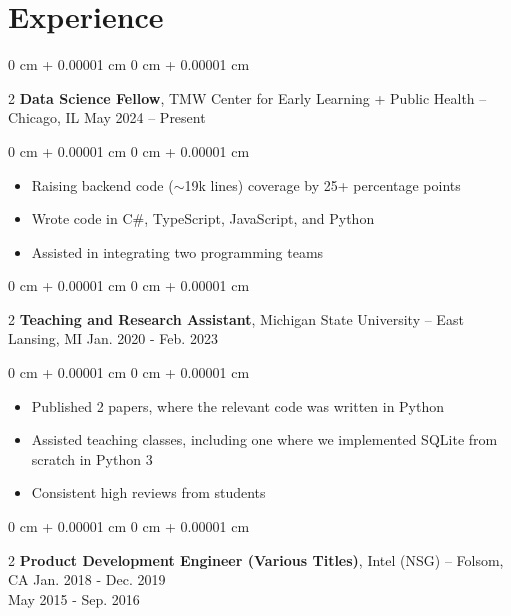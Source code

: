 \documentclass[10pt, letterpaper]{article}
\newenvironment{highlights}{ \begin{itemize}[ topsep=0.10 cm, parsep=0.10 cm, partopsep=0pt,
itemsep=0pt, leftmargin=0 cm + 10pt ] }{ \end{itemize} } %
\newenvironment{onecolentry}{ \begin{adjustwidth}{ 0 cm + 0.00001 cm }{ 0 cm + 0.00001 cm }
}{ \end{adjustwidth} } %
\newenvironment{twocolentry}[2][]{ \onecolentry \def\secondColumn{#2} \setcolumnwidth{\fill, 4.5 cm}
\begin{paracol}{2} }{ \switchcolumn \raggedleft \secondColumn \end{paracol}
\endonecolentry } %
\begin{document}
	\section{Experience}

	\begin{twocolentry}
		{ May 2024 – Present } \textbf{Data Science Fellow}, TMW Center for Early Learning
		+ Public Health -- Chicago, IL
	\end{twocolentry}

	\vspace{0.10 cm}
	\begin{onecolentry}
		\begin{highlights}
			\item Raising backend code ($\sim$19k lines) coverage by 25+ percentage points
			\item Wrote code in C\#, TypeScript, JavaScript, and Python \item Assisted
			in integrating two programming teams
		\end{highlights}
	\end{onecolentry}

	\vspace{0.2 cm}

	\begin{twocolentry}
		{ Jan. 2020 - Feb. 2023 } \textbf{Teaching and Research Assistant}, Michigan
		State University -- East Lansing, MI
	\end{twocolentry}

	\vspace{0.10 cm}
	\begin{onecolentry}
		\begin{highlights}
			\item Published 2 papers, where the relevant code was written in Python
			\item Assisted teaching classes, including one where we implemented SQLite
			from scratch in Python 3 \item Consistent high reviews from students
		\end{highlights}
	\end{onecolentry}

	\vspace{0.2 cm}

	\begin{twocolentry}
		{ Jan. 2018 - Dec. 2019 \\ May 2015 - Sep. 2016 } \textbf{Product
		Development Engineer (Various Titles)}, Intel (NSG) -- Folsom, CA
	\end{twocolentry}
\end{document}

